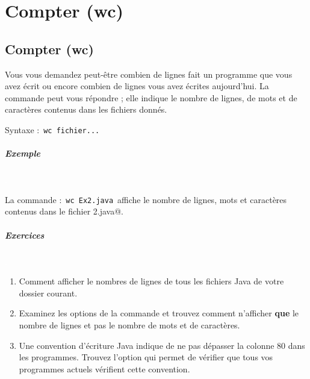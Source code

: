 \documentclass[11pt,a4paper]{article}
\begin{document}
        \section{Compter (wc)}\subsection{Compter (wc)}
					Vous vous demandez peut-\^etre
					combien de lignes fait un programme
					que vous avez \'ecrit
					ou encore 
					combien de lignes vous avez \'ecrites aujourd'hui.
					La commande 
					\verb@wc@
					peut vous r\'epondre ;
					elle indique le nombre de lignes,
					de mots et de caract\`eres
					contenus dans les fichiers donn\'es.
					\par
				
					Syntaxe : 
					\,\verb|wc fichier...|\,
            \par
        
			
		\subparagraph{Exemple} 
		
					\textcolor{white}{.} \par
				
					La commande : 
					\,\verb|wc Ex2.java|\,
					affiche le nombre de lignes, mots et caract\`eres
					contenus dans le fichier
					\verb@Ex2.java@.
				
            \par
        
			
		\subparagraph{Exercices} 
		
					\textcolor{white}{.} \par
				
					\begin{enumerate}
				
			\item 
							Comment afficher le nombres de lignes
							de tous les fichiers Java de votre dossier courant.
						
			\item 
							Examinez les options de la commande
							et trouvez comment n'afficher
							\textbf{que}
							le nombre de lignes
							et pas le nombre de mots et de caract\`eres.
						
			\item 
							Une convention d'\'ecriture Java
							indique de ne pas d\'epasser la
							colonne 80 dans les programmes.
							Trouvez l'option qui permet de
							v\'erifier que tous vos programmes
							actuels v\'erifient cette convention.
						
					\end{enumerate}
				
\end{document}
